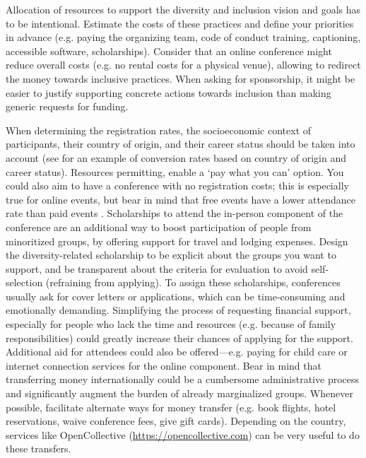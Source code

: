 \documentclass[10pt,letterpaper]{article}
\begin{document}
Allocation of resources to support the diversity and inclusion vision and goals has to be intentional. 
Estimate the costs of these practices and define your priorities in advance (e.g. paying the organizing team, code of conduct training, captioning, accessible software, scholarships).
Consider that an online conference might reduce overall costs (e.g. no rental costs for a physical venue), allowing to redirect the money towards inclusive practices. 
When asking for sponsorship, it might be easier to justify supporting concrete actions towards inclusion than making generic requests for funding.

When determining the registration rates, the socioeconomic context of participants, their country of origin, and their career status should be taken into account  \cite{sarabipourChangingScientificMeetings2021, andalibPostdocQueueLabour2018, kaplanPostdocNot2012}
(see \cite{canelon2021cost} for an example of conversion rates based on country of origin and career status). 
Resources permitting, enable a `pay what you can' option. You could also aim to have a conference with no registration costs; this is especially true for online events, but bear in mind that free events have a lower attendance rate than paid events \cite{eventbrite_ultimate_2017}. 
Scholarships to attend the in-person component of the conference are an additional way to boost participation of people from minoritized groups, by offering support for travel and lodging expenses.
Design the diversity-related scholarship to be explicit about the groups you want to support, and be transparent about the criteria for evaluation to avoid self-selection (refraining from applying). 
To assign these scholarships, conferences usually ask for cover letters or applications, which can be time-consuming and emotionally demanding. 
Simplifying the process of requesting financial support, especially for 
people who lack the time and resources (e.g. because of family responsibilities) could greatly increase their chances of applying for the support. 
Additional aid for attendees could also be offered—e.g. paying for child care or internet connection services for the online component. 
Bear in mind that transferring money internationally could be a cumbersome administrative process and significantly augment the burden of already marginalized groups. Whenever possible, facilitate alternate ways for money transfer (e.g. book flights, hotel reservations, waive conference fees, give gift cards). Depending on the country, services like OpenCollective (\url{https://opencollective.com}) can be very useful to do these transfers. 
\end{document}

